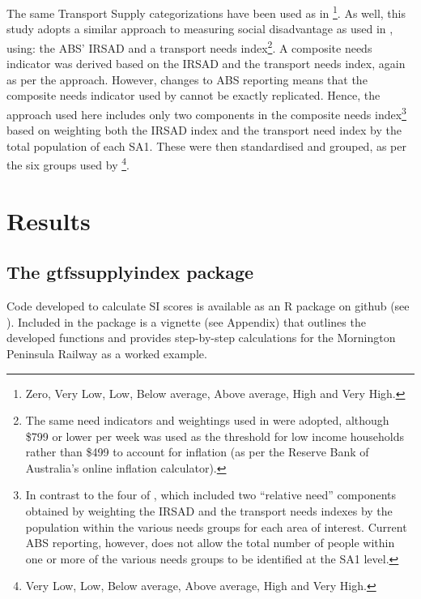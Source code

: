 \documentclass[preprint, 3p,
authoryear]{elsarticle} %
\begin{document}
The same Transport Supply categorizations have been used as in
\citet{currie2010identifying}\footnote{Zero, Very Low, Low, Below
  average, Above average, High and Very High.}. As well, this study
adopts a similar approach to measuring social disadvantage as used in
\citet{currie2010identifying}, using: the ABS' IRSAD and a transport
needs index\footnote{The same need indicators and weightings used in
  \citet{currie2010identifying} were adopted, although \$799 or lower
  per week was used as the threshold for low income households rather
  than \$499 to account for inflation (as per the Reserve Bank of
  Australia's online inflation calculator).}. A composite needs
indicator was derived based on the IRSAD and the transport needs index,
again as per the \citet{currie2010identifying} approach. However,
changes to ABS reporting means that the composite needs indicator used
by \citet{currie2010identifying} cannot be exactly replicated. Hence,
the approach used here includes only two components in the composite
needs index\footnote{In contrast to the four of
  \citet{currie2010identifying}, which included two ``relative need''
  components obtained by weighting the IRSAD and the transport needs
  indexes by the population within the various needs groups for each
  area of interest. Current ABS reporting, however, does not allow the
  total number of people within one or more of the various needs groups
  to be identified at the SA1 level.} based on weighting both the IRSAD
index and the transport need index by the total population of each SA1.
These were then standardised and grouped, as per the six groups used by
\citet{currie2010identifying}\footnote{Very Low, Low, Below average,
  Above average, High and Very High.}.

\section{Results}\label{results}

\subsection{The gtfssupplyindex
package}\label{the-gtfssupplyindex-package}

Code developed to calculate SI scores is available as an R package on
github (see \citet{gtfssupplyindex_github}). Included in the package is
a vignette (see Appendix) that outlines the developed functions and
provides step-by-step calculations for the Mornington Peninsula Railway
as a worked example.
\end{document}
